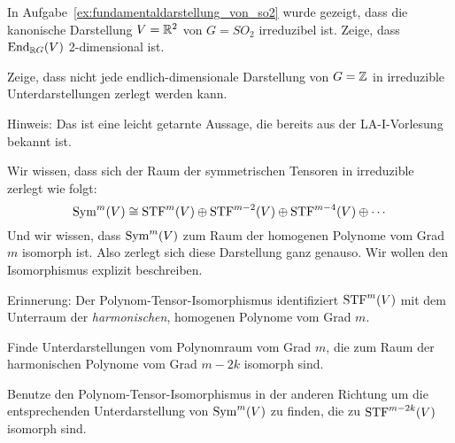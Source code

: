\begin{sheet}

\begin{problem}[title={Satz von Schur über Körpern $\neq\IC$}]
In Aufgabe~\ref{ex:fundamentaldarstellung_von_so2} wurde gezeigt, dass die kanonische Darstellung $V=\mathbb{R}^2$ von $G=SO_2$ irreduzibel ist. Zeige, dass $\operatorname{End}_{\mathbb{R} G}(V)$ 2-dimensional ist.
\end{problem}

\begin{problem}[title={Der Satz von Maschke ist falsch für nichtkompakte Gruppen}, difficulty={leichter als es aussieht}]
Zeige, dass nicht jede endlich-dimensionale Darstellung von $G=\mathbb{Z}$ in irreduzible Unterdarstellungen zerlegt werden kann.

Hinweis: Das ist eine leicht getarnte Aussage, die bereits aus der LA-I-Vorlesung bekannt ist.
\end{problem}

\begin{problem}[title={Isomorphismus zwischen irreduziblen Darstellungen von Polynomen und Tensoren}]
Wir wissen, dass sich der Raum der symmetrischen Tensoren in irreduzible zerlegt wie folgt:
\[\operatorname{Sym}^m(V) \cong \operatorname{STF}^m(V) \oplus \operatorname{STF}^{m-2}(V) \oplus \operatorname{STF}^{m-4}(V) \oplus \cdots\]
Und wir wissen, dass $\operatorname{Sym}^m(V)$ zum Raum der homogenen Polynome vom Grad $m$ isomorph ist. Also zerlegt sich diese Darstellung ganz genauso. Wir wollen den Isomorphismus explizit beschreiben.
\begin{subproblem}
Erinnerung: Der Polynom-Tensor-Isomorphismus identifiziert $\operatorname{STF}^m(V)$ mit dem Unterraum der \emph{harmonischen}, homogenen Polynome vom Grad $m$.

Finde Unterdarstellungen vom Polynomraum vom Grad $m$, die zum Raum der harmonischen Polynome vom Grad $m-2k$ isomorph sind.
\end{subproblem}
\begin{subproblem}
Benutze den Polynom-Tensor-Isomorphismus in der anderen Richtung um die entsprechenden Unterdarstellung von $\operatorname{Sym}^m(V)$ zu finden, die zu $\operatorname{STF}^{m-2k}(V)$ isomorph sind.
\end{subproblem}
\end{problem}



\end{sheet}
